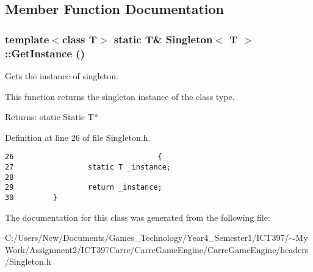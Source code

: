 \subsection{Member Function Documentation}
\hypertarget{class_singleton_db2c49abf86f1ada00d6811f30edd9e6}{
\subsubsection[GetInstance]{\setlength{\rightskip}{0pt plus 5cm}template$<$class T$>$ static T\& {\bf Singleton}$<$ T $>$::GetInstance ()}}
\label{class_singleton_db2c49abf86f1ada00d6811f30edd9e6}


Gets the instance of singleton. 

This function returns the singleton instance of the class type.

\begin{Desc}
\item[Returns:]static Static T$\ast$ \end{Desc}


Definition at line 26 of file Singleton.h.

\begin{Code}\begin{verbatim}26                                 {
27                 static T _instance;
28                 
29                 return _instance;
30         }
\end{verbatim}
\end{Code}




The documentation for this class was generated from the following file:\begin{CompactItemize}
\item 
C:/Users/New/Documents/Games\_\-Technology/Year4\_\-Semester1/ICT397/$\sim$My Work/Assignment2/ICT397Carre/CarreGameEngine/CarreGameEngine/headers/Singleton.h\end{CompactItemize}
